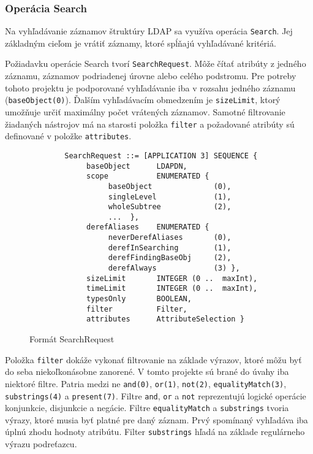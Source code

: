 \documentclass[11pt,a4paper]{article}
\begin{document}
\subsubsection{Operácia Search}
Na vyhľadávanie záznamov štruktúry LDAP sa využíva operácia \texttt{Search}. Jej základným cieľom je vrátiť záznamy, ktoré spĺňajú vyhľadávané kritériá. 

Požiadavku operácie Search tvorí \texttt{SearchRequest}. Môže čítať atribúty z jedného záznamu, záznamov podriadenej úrovne alebo celého podstromu. Pre potreby tohoto projektu je podporované vyhľadávanie iba v rozsahu jedného záznamu (\texttt{baseObject(0)}). Ďalším vyhľadávacím obmedzením je \texttt{sizeLimit}, ktorý umožňuje určiť maximálny počet vrátených záznamov. Samotné filtrovanie žiadaných nástrojov má na starosti položka \texttt{filter} a požadované atribúty sú definované v položke \texttt{attributes}. \\

\begin{figure}[H]
\begin{verbatim}
        SearchRequest ::= [APPLICATION 3] SEQUENCE {
             baseObject      LDAPDN,
             scope           ENUMERATED {
                  baseObject              (0),
                  singleLevel             (1),
                  wholeSubtree            (2),
                  ...  },
             derefAliases    ENUMERATED {
                  neverDerefAliases       (0),
                  derefInSearching        (1),
                  derefFindingBaseObj     (2),
                  derefAlways             (3) },
             sizeLimit       INTEGER (0 ..  maxInt),
             timeLimit       INTEGER (0 ..  maxInt),
             typesOnly       BOOLEAN,
             filter          Filter,
             attributes      AttributeSelection }
\end{verbatim}
\caption{Formát SearchRequest}
\end{figure}

\noindent Položka \texttt{filter} dokáže vykonať filtrovanie na základe výrazov, ktoré môžu byť do seba niekoľkonásobne zanorené. V tomto projekte sú brané do úvahy iba niektoré filtre. Patria medzi ne \texttt{and(0)}, \texttt{or(1)}, \texttt{not(2)}, \texttt{equalityMatch(3)}, \texttt{substrings(4)} a \texttt{present(7)}. Filtre \texttt{and}, \texttt{or} a \texttt{not} reprezentujú logické operácie konjunkcie, disjunkcie a negácie. Filtre \texttt{equalityMatch} a \texttt{substrings} tvoria výrazy, ktoré musia byť platné pre daný záznam. Prvý spomínaný vyhľadáva iba úplnú zhodu hodnoty atribútu. Filter \texttt{substrings} hľadá na základe regulárneho výrazu podreťazcu.\\ 
\end{document}
